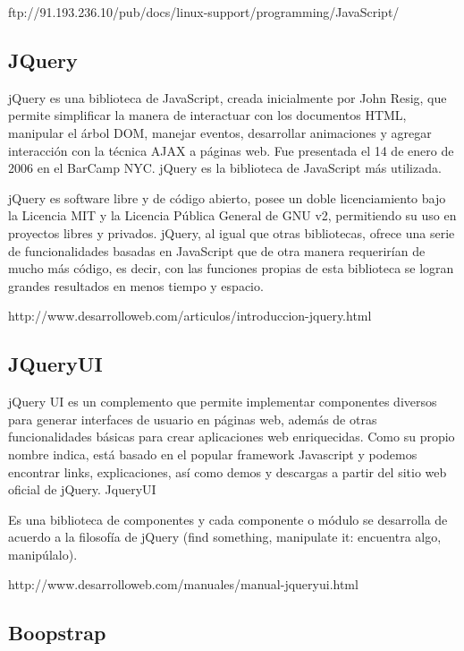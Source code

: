 ftp://91.193.236.10/pub/docs/linux-support/programming/JavaScript/%

\subsection{JQuery}

jQuery es una biblioteca de JavaScript, creada inicialmente por John Resig, que permite simplificar la manera de interactuar con los documentos HTML, manipular el árbol DOM, manejar eventos, desarrollar animaciones y agregar interacción con la técnica AJAX a páginas web. Fue presentada el 14 de enero de 2006 en el BarCamp NYC. jQuery es la biblioteca de JavaScript más utilizada.

jQuery es software libre y de código abierto, posee un doble licenciamiento bajo la Licencia MIT y la Licencia Pública General de GNU v2, permitiendo su uso en proyectos libres y privados. jQuery, al igual que otras bibliotecas, ofrece una serie de funcionalidades basadas en JavaScript que de otra manera requerirían de mucho más código, es decir, con las funciones propias de esta biblioteca se logran grandes resultados en menos tiempo y espacio.

http://www.desarrolloweb.com/articulos/introduccion-jquery.html

\subsection{JQueryUI}

jQuery UI es un complemento que permite implementar componentes diversos para generar interfaces de usuario en páginas web, además de otras funcionalidades básicas para crear aplicaciones web enriquecidas. Como su propio nombre indica, está basado en el popular framework Javascript y podemos encontrar links, explicaciones, así como demos y descargas a partir del sitio web oficial de jQuery.
JqueryUI

Es una biblioteca de componentes y cada componente o módulo se desarrolla de acuerdo a la filosofía de jQuery (find something, manipulate it: encuentra algo, manipúlalo).

http://www.desarrolloweb.com/manuales/manual-jqueryui.html

\subsection{Boopstrap}

